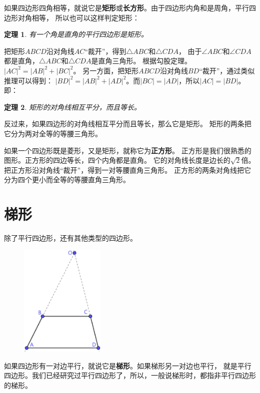 \documentclass[12pt,UTF8]{ctexbook}
\newtheorem{tm}{定理}[section]
\begin{document}
如果四边形四角相等，就说它是\textbf{矩形}或\textbf{长方形}。由于四边形内角和是周角，平行四边形对角相等，
所以也可以这样判定矩形：
\begin{tm}\label{tm:0-1-10}
    有一个角是直角的平行四边形是矩形。
\end{tm}

把矩形$ABCD$沿对角线$AC$“裁开”，得到$\triangle ABC$和$\triangle CDA$，
由于$\angle ABC$和$\angle CDA$都是直角，$\triangle ABC$和$\triangle CDA$是直角三角形。
根据勾股定理。$|AC|^2 = |AB|^2 + |BC|^2$。
另一方面，把矩形$ABCD$沿对角线$BD$“裁开”，通过类似推理可以得到：
$|BD|^2 = |AB|^2 + |AD|^2$。而$|BC| = |AD|$，所以$|AC| = |BD|$。即：
\begin{tm}\label{tm:0-1-15}
    矩形的对角线相互平分，而且等长。
\end{tm}

反过来，如果四边形的对角线相互平分而且等长，那么它是矩形。
矩形的两条把它分为两对全等的等腰三角形。

如果一个四边形既是菱形，又是矩形，就称它为\textbf{正方形}。
正方形是我们很熟悉的图形。正方形的四边等长，四个内角都是直角。
它的对角线长度是边长的$\sqrt{2}$倍。把正方形沿对角线“裁开”，得到一对等腰直角三角形。
正方形的两条对角线把它分为四个更小而全等的等腰直角三角形。

\section{梯形}
除了平行四边形，还有其他类型的四边形。

\begin{figure} %
    \vspace{-35pt}
    \centering
    \includegraphics[width=0.36\textwidth]{tu/梯形1.png}
\end{figure}

如果四边形有一对边平行，就说它是\textbf{梯形}。如果梯形另一对边也平行，
就是平行四边形。我们已经研究过平行四边形了，所以，一般说梯形时，都指非平行四边形的梯形。
\end{document}
